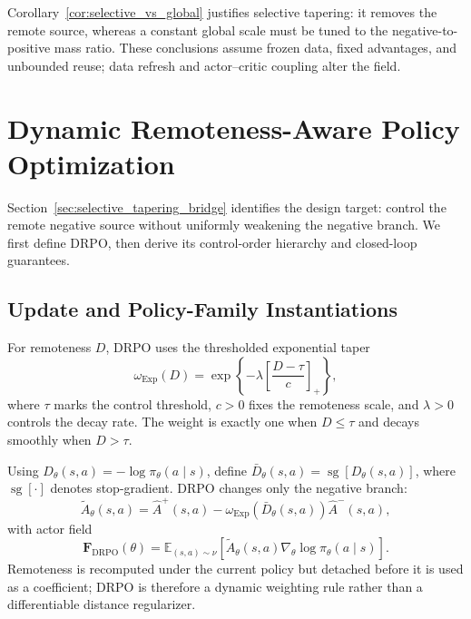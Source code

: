 \documentclass{article}
\theoremstyle{plain}
\theoremstyle{definition}
\theoremstyle{remark}
\begin{document}
Corollary~\ref{cor:selective_vs_global} justifies selective tapering: it
removes the remote source, whereas a constant global scale must be tuned to
the negative-to-positive mass ratio. These conclusions assume frozen data,
fixed advantages, and unbounded reuse; data refresh and actor--critic
coupling alter the field.

\section{Dynamic Remoteness-Aware Policy Optimization}
\label{sec:drpo}

Section~\ref{sec:selective_tapering_bridge} identifies the design target:
control the remote negative source without uniformly weakening the negative
branch. We first define DRPO, then derive its control-order hierarchy and
closed-loop guarantees.

\subsection{Update and Policy-Family Instantiations}
\label{subsec:drpo_update}

For remoteness \(D\), DRPO uses the thresholded exponential taper
\begin{equation}
    \omega_{\mathrm{Exp}}(D)
    =
    \exp
    \left\{
        -\lambda
        \left[
            \frac{D-\tau}{c}
        \right]_{+}
    \right\},
    \label{eq:drpo_exp_weight}
\end{equation}
where \(\tau\) marks the control threshold, \(c>0\) fixes the remoteness
scale, and \(\lambda>0\) controls the decay rate. The weight is exactly one
when \(D\leq\tau\) and decays smoothly when \(D>\tau\).

Using \(D_\theta(s,a)=-\log\pi_\theta(a\mid s)\), define
\(\bar D_\theta(s,a)=\operatorname{sg}[D_\theta(s,a)]\), where
\(\operatorname{sg}[\cdot]\) denotes stop-gradient. DRPO changes only the
negative branch:
\begin{equation}
    \widetilde A_{\theta}(s,a)
    =
    \widehat A^{+}(s,a)
    -
    \omega_{\mathrm{Exp}}
    \!\left(\bar D_\theta(s,a)\right)
    \widehat A^{-}(s,a),
    \label{eq:drpo_effective_advantage}
\end{equation}
with actor field
\begin{equation}
    \mathbf F_{\mathrm{DRPO}}(\theta)
    =
    \mathbb E_{(s,a)\sim\nu}
    \left[
        \widetilde A_{\theta}(s,a)
        \nabla_\theta\log\pi_\theta(a\mid s)
    \right].
    \label{eq:drpo_actor_field}
\end{equation}
Remoteness is recomputed under the current policy but detached before it is
used as a coefficient; DRPO is therefore a dynamic weighting rule rather than
a differentiable distance regularizer.
\end{document}
